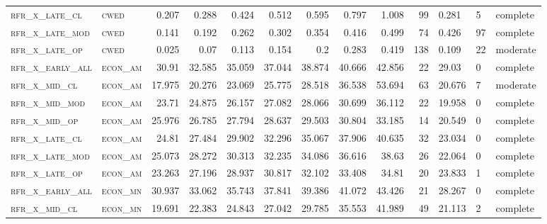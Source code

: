 \begin{landscape}
\begin{center}
\begin{footnotesize}
\begin{longtable}{llrrrrr|rrr}
\textsc{rfr\_x\_late\_cl  } & \textsc{cwed      }   & 0.207   & 0.288   & 0.424   & 0.512    & 0.595    & 0.797    & 1.008    & 99     & 0.281         & 5             & complete        \\
\textsc{rfr\_x\_late\_mod } & \textsc{cwed      }   & 0.141   & 0.192   & 0.262   & 0.302    & 0.354    & 0.416    & 0.499    & 74     & 0.426         & 97            & complete        \\
\textsc{rfr\_x\_late\_op  } & \textsc{cwed      }   & 0.025   & 0.07    & 0.113   & 0.154    & 0.2      & 0.283    & 0.419    & 138    & 0.109         & 22            & moderate        \\
\textsc{rfr\_x\_early\_all} & \textsc{econ\_am  }   & 30.91   & 32.585  & 35.059  & 37.044   & 38.874   & 40.666   & 42.856   & 22     & 29.03         & 0             & complete            \\
\textsc{rfr\_x\_mid\_cl   } & \textsc{econ\_am  }   & 17.975  & 20.276  & 23.069  & 25.775   & 28.518   & 36.538   & 53.694   & 63     & 20.676        & 7             & moderate        \\
\textsc{rfr\_x\_mid\_mod  } & \textsc{econ\_am  }   & 23.71   & 24.875  & 26.157  & 27.082   & 28.066   & 30.699   & 36.112   & 22     & 19.958        & 0             & complete            \\
\textsc{rfr\_x\_mid\_op   } & \textsc{econ\_am  }   & 25.976  & 26.785  & 27.794  & 28.637   & 29.503   & 30.804   & 33.185   & 14     & 20.549        & 0             & complete            \\
\textsc{rfr\_x\_late\_cl  } & \textsc{econ\_am  }   & 24.81   & 27.484  & 29.902  & 32.296   & 35.067   & 37.906   & 40.635   & 32     & 23.034        & 0             & complete            \\
\textsc{rfr\_x\_late\_mod } & \textsc{econ\_am  }   & 25.073  & 28.272  & 30.313  & 32.235   & 34.086   & 36.616   & 38.63    & 26     & 22.064        & 0             & complete            \\
\textsc{rfr\_x\_late\_op  } & \textsc{econ\_am  }   & 23.263  & 27.196  & 28.937  & 30.817   & 32.102   & 33.408   & 34.81    & 20     & 23.833        & 1             & complete        \\
\textsc{rfr\_x\_early\_all} & \textsc{econ\_mn  }   & 30.937  & 33.062  & 35.743  & 37.841   & 39.386   & 41.072   & 43.426   & 21     & 28.267        & 0             & complete            \\
\textsc{rfr\_x\_mid\_cl   } & \textsc{econ\_mn  }   & 19.691  & 22.383  & 24.843  & 27.042   & 29.785   & 35.553   & 41.989   & 49     & 21.113        & 2             & complete        \\

\end{longtable}
\end{footnotesize}
\end{center}
\end{landscape}
